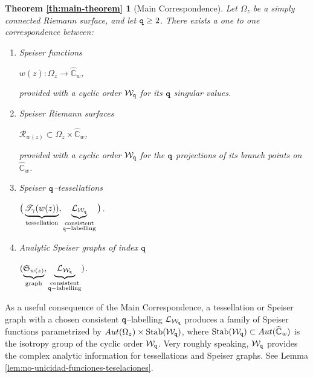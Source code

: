 \documentclass[final,3p,times]{elsarticle}
\newcommand{\CW}{\ensuremath{{\widehat{\mathbb C}}}}
\newcommand{\R}{\ensuremath{{\mathcal R}}}
\theoremstyle{definition}
\begin{document}
\theoremstyle{plain}%
\newtheorem*{theoMain}{Theorem \ref{th:main-theorem}}
\begin{theoMain}[Main Correspondence]
Let $\Omega_z$ be a simply connected Riemann surface, 
and let ${\tt q} \geq 2$.
There exists a one to one correspondence between:
\begin{enumerate}[label=\arabic*),leftmargin=*]

\item
Speiser functions 

\centerline{$w(z): \Omega_z \longrightarrow \CW_w$,}

\noindent  
provided with a cyclic order $\mathcal{W}_{\tt q}$ 
for its ${\tt q}$ singular values.

\item 
Speiser Riemann surfaces 

\centerline{$\R_{w(z)} \subset  \Omega_z \times \CW_w$, }

\noindent 
provided with a cyclic order $\mathcal{W}_{\tt q}$ 
for the $\tt q$ projections of its branch points on $\CW_w$.

\item
Speiser $\tt q$--tessellations 

\centerline{
$
\big( \underbrace{ \mathscr{T}_\gamma(w(z)) }_{\text{tessellation}}, 
\underbrace{ \mathcal{L}_{\mathcal{W}_{\tt q}} }_{\substack{ \text{consistent}\\
{\tt q}-\text{labelling}} }  \big) 
$.
}

\item
Analytic Speiser graphs of index $\tt q$

\centerline{
$(
\underbrace{\mathfrak{S}_{w(z)} }_{\text{graph}}, 
\underbrace{\  \mathcal{L}_{\mathcal{W}_{\tt q}} \ }_{
\substack{ \text{consistent}\\
{\tt q}-\text{labelling}}
} )$.}

\end{enumerate}
\end{theoMain}

As a useful consequence of the Main Correspondence, 
a tessellation or Speiser graph with a 
chosen consistent $\tt q$--labelling
$\mathcal{L}_{\mathcal{W}_{\tt q}}$ produces a family 
of Speiser functions parametrized by 
$Aut(\Omega_z)\times \text{Stab}(\mathcal{W}_{\tt q})$, 
where $\text{Stab}(\mathcal{W}_{\tt q}) \subset Aut(\CW_w)$ 
is the isotropy group of the cyclic order $\mathcal{W}_{\tt q}$.
Very roughly speaking, $\mathcal{W}_{\tt q}$ 
provides the complex analytic information for
tessellations and Speiser graphs. 
See Lemma \ref{lem:no-unicidad-funciones-teselaciones}.
\end{document}
